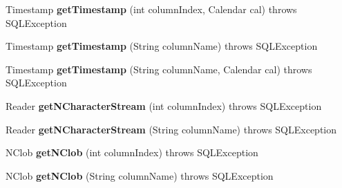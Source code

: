 \begin{DoxyCompactItemize}
\mbox{\label{classcom_1_1mysql_1_1cj_1_1jdbc_1_1result_1_1_result_set_impl_a3c1f7335703251bc3c9a29f4182927b0}} 
Timestamp {\bfseries get\+Timestamp} (int column\+Index, Calendar cal)  throws S\+Q\+L\+Exception 
\item 
\mbox{\label{classcom_1_1mysql_1_1cj_1_1jdbc_1_1result_1_1_result_set_impl_aac901624f7fe254ca601cd7bc69f5ad2}} 
Timestamp {\bfseries get\+Timestamp} (String column\+Name)  throws S\+Q\+L\+Exception 
\item 
\mbox{\label{classcom_1_1mysql_1_1cj_1_1jdbc_1_1result_1_1_result_set_impl_a189b75c953f07c02cbf89c81e026de87}} 
Timestamp {\bfseries get\+Timestamp} (String column\+Name, Calendar cal)  throws S\+Q\+L\+Exception 
\item 
\mbox{\label{classcom_1_1mysql_1_1cj_1_1jdbc_1_1result_1_1_result_set_impl_a0eeb7429fd76f20bad6c3cbc3502b790}} 
Reader {\bfseries get\+N\+Character\+Stream} (int column\+Index)  throws S\+Q\+L\+Exception 
\item 
\mbox{\label{classcom_1_1mysql_1_1cj_1_1jdbc_1_1result_1_1_result_set_impl_a9c5ff18931b50a048bc91125ac8d9756}} 
Reader {\bfseries get\+N\+Character\+Stream} (String column\+Name)  throws S\+Q\+L\+Exception 
\item 
\mbox{\label{classcom_1_1mysql_1_1cj_1_1jdbc_1_1result_1_1_result_set_impl_a2d8f0a9320a523bab8207a44f9bca912}} 
N\+Clob {\bfseries get\+N\+Clob} (int column\+Index)  throws S\+Q\+L\+Exception 
\item 
\mbox{\label{classcom_1_1mysql_1_1cj_1_1jdbc_1_1result_1_1_result_set_impl_af42a2e37e678c6e5dbbd27ffbb84aff5}} 
N\+Clob {\bfseries get\+N\+Clob} (String column\+Name)  throws S\+Q\+L\+Exception 
\item 
\mbox{\label{classcom_1_1mysql_1_1cj_1_1jdbc_1_1result_1_1_result_set_impl_a2ebe0ca3240595aca6946bcf24bc858e}} 

\end{DoxyCompactItemize}
